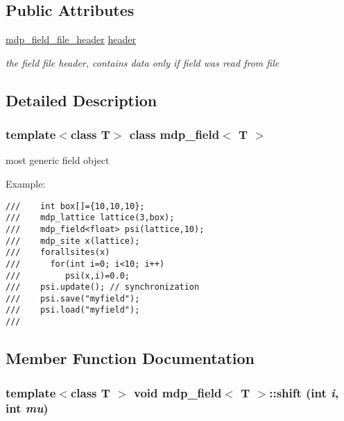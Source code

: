 \subsection*{Public Attributes}
\begin{CompactItemize}
\item 
\hypertarget{classmdp__field_465dfc6a95fe7ca5016595550cd024d9}{
\hyperlink{classmdp__field__file__header}{mdp\_\-field\_\-file\_\-header} \hyperlink{classmdp__field_465dfc6a95fe7ca5016595550cd024d9}{header}}
\label{classmdp__field_465dfc6a95fe7ca5016595550cd024d9}

\begin{CompactList}\small\item\em the field file header, contains data only if field was read from file \item\end{CompactList}\end{CompactItemize}


\subsection{Detailed Description}
\subsubsection*{template$<$class T$>$ class mdp\_\-field$<$ T $>$}

most generic field object 

Example: 

\footnotesize\begin{verbatim}
///    int box[]={10,10,10};
///    mdp_lattice lattice(3,box);
///    mdp_field<float> psi(lattice,10);
///    mdp_site x(lattice);
///    forallsites(x)
///      for(int i=0; i<10; i++)
///         psi(x,i)=0.0;
///    psi.update(); // synchronization
///    psi.save("myfield");
///    psi.load("myfield");
/// \end{verbatim}
\normalsize
 

\subsection{Member Function Documentation}
\hypertarget{classmdp__field_8ff0ae3336b70be5c58299322662275e}{
\subsubsection[{shift}]{\setlength{\rightskip}{0pt plus 5cm}template$<$class T $>$ void {\bf mdp\_\-field}$<$ T $>$::shift (int {\em i}, \/  int {\em mu})}}
\label{classmdp__field_8ff0ae3336b70be5c58299322662275e}


